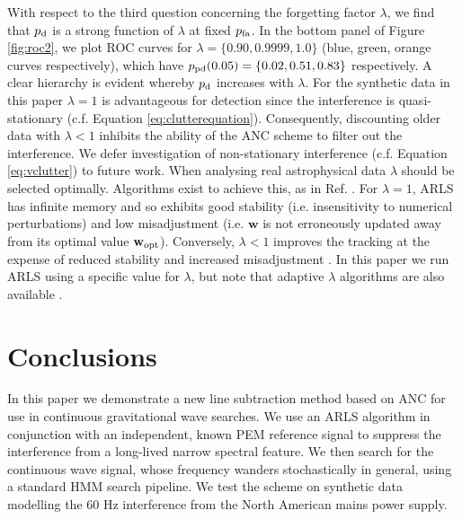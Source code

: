 \documentclass[pra,superscriptaddress,reprint,amsmath,amssymb,nofootinbib]{revtex4-2}
\begin{document}
With respect to the third question concerning the forgetting factor $\lambda$, we find that $p_{\rm d}$ is a strong function of $\lambda$ at fixed $p_{\rm fa}$. In the bottom panel of Figure \ref{fig:roc2}, we plot ROC curves for $\lambda = \{0.90,0.9999,1.0\}$ (blue, green, orange curves respectively), which have $p_{\rm pd} (0.05) = \{0.02, 0.51, 0.83\}$ respectively. A clear hierarchy is evident whereby $p_{\rm d}$ increases with $\lambda$. For the synthetic data in this paper $\lambda=1$ is advantageous for detection since the interference is quasi-stationary (c.f. Equation \ref{eq:clutterequation}). Consequently, discounting older data with $\lambda < 1$ inhibits the ability of the ANC scheme to filter out the interference. We defer investigation of non-stationary interference (c.f. Equation \ref{eq:vclutter}) to future work. When analysing real astrophysical data $\lambda$ should be selected optimally. Algorithms exist to achieve this, as in Ref. \citep{6349749}. For $\lambda = 1$, ARLS has infinite memory and so exhibits good stability (i.e. insensitivity to numerical perturbations) and low misadjustment (i.e. $\mathbf{w}$ is not erroneously updated away from its optimal value $\mathbf{w}_{\rm opt}$). Conversely, $\lambda < 1$ improves the tracking at the expense of reduced stability and increased misadjustment \citep{Ciochina5206117}. In this paper we run ARLS using a specific value for $\lambda$, but note that adaptive $\lambda$ algorithms are also available \citep{app12042077,1468506,4639569}. \newline 




\section{Conclusions}\label{sec:conclusions}
In this paper we demonstrate a new line subtraction method based on ANC for use in continuous gravitational wave searches. We use an ARLS algorithm in conjunction with an independent, known PEM reference signal to suppress the interference from a long-lived narrow spectral feature. We then search for the continuous wave signal, whose frequency wanders stochastically in general, using a standard HMM search pipeline. We test the scheme on synthetic data modelling the 60 Hz interference from the North American mains power supply. \newline 
\end{document}
